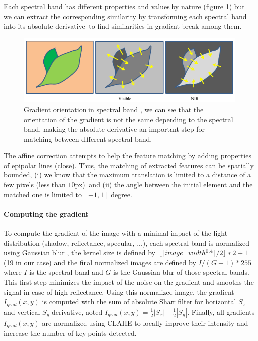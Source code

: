 \documentclass[]{elsarticle}
\DeclarePairedDelimiter\ceil{\lceil}{\rceil}
\DeclarePairedDelimiter\floor{\lfloor}{\rfloor}
\begin{document}
	
	Each spectral band has different properties and values by nature (figure \ref{fig:vegetable-gradient})
	but we can extract the corresponding similarity by transforming each spectral band into its absolute derivative,
	to find similarities in gradient break among them.
	
	\begin{figure}[H]
		\centering
		\includegraphics[width=0.6\linewidth]{../figures/contrast-inversion.png}
		\caption{
			Gradient orientation in spectral band \cite{rabatel:hal-01684135},
			we can see that the orientation of the gradient is not the same depending to the spectral band,
			making the absolute derivative an important step for matching between different spectral band.
		}
		\label{fig:vegetable-gradient}
	\end{figure}
	
	\par The affine correction attempts to help the feature matching by adding properties of epipolar lines (close).
	Thus, the matching of extracted features can be spatially bounded,
	(i) we know that the maximum translation is limited to a distance of a few pixels (less than $10$px),
	and (ii) the angle between the initial element and the matched one is limited to $[-1,1]$ degree.
	
	\paragraph{Computing the gradient} \label{sec:pre-processing} To compute the gradient of the image with a minimal impact of the light distribution (shadow, reflectance, specular, ...),
	each spectral band is normalized using Gaussian blur \cite{sage0303}, the kernel size is defined by $\floor{\ceil{image\_width^{0.4}}/2} * 2 +1$ (19 in our case)
	and the final normalized images are defined by $I/(G+1)*255$ where $I$ is the spectral band and $G$ is the Gaussian blur of those spectral bands.
	This first step minimizes the impact of the noise on the gradient and smooths the signal in case of high reflectance.
	Using this normalized image, the gradient $I_{grad}(x,y)$ is computed with the sum of absolute Sharr filter \cite{Seitz}
	for horizontal $S_x$ and vertical $S_y$ derivative, noted $I_{grad}(x,y)=\frac{1}{2}|S_x|+\frac{1}{2}|S_y|$.
	Finally, all gradients $I_{grad}(x,y)$ are normalized using CLAHE \cite{zuiderveld1994contrast} to locally improve their intensity and increase the number of key points detected.%
	
\end{document}
